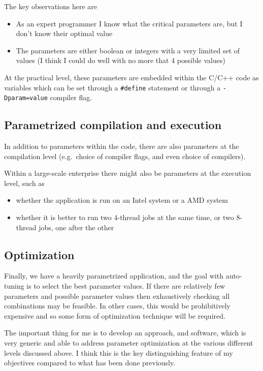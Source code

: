 \documentclass[12pt]{article}
\begin{document}
\newpage

The key observations here are
\begin{itemize}
\item
As an expert programmer I know what the critical parameters
are, but I don't know their optimal value
\item
The parameters are either boolean or integers with a very 
limited set of values (I think I could do well with no more
that 4 possible values)
\end{itemize}

At the practical level, these parameters are embedded within
the C/C++ code as variables which can be set through a 
{\tt \#define} statement or through a {\tt -Dparam=value}
compiler flag.


\subsection{Parametrized compilation and execution}

In addition to parameters within the code, there are also
parameters at the compilation level (e.g.~choice of compiler 
flags, and even choice of compilers).

Within a large-scale enterprise there might also be parameters
at the execution level, such as
\begin{itemize}
\item
whether the application is run on an Intel system or a AMD system

\item
whether it is better to run two 4-thread jobs at the same time, 
or two 8-thread jobs, one after the other
\end{itemize}


\subsection{Optimization}

Finally, we have a heavily parametrized application, and the
goal with auto-tuning is to select the best parameter values.
If there are relatively few parameters and possible parameter 
values then exhaustively checking all combinations may be 
feasible.  In other cases, this would be prohibitively expensive 
and so some form of optimization technique will be required.

The important thing for me is to develop an approach, and
software, which is very generic and able to address 
parameter optimization at the various different levels 
discussed above.  I think this is the key distinguishing 
feature of my objectives compared to what has been done 
previously.
\end{document}
